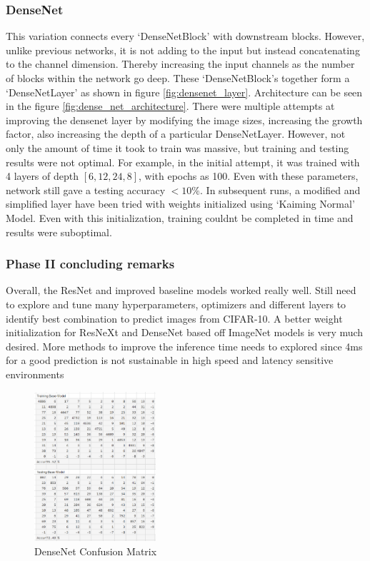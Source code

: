 \documentclass[conference]{IEEEtran}
\begin{document}
	
		\subsubsection{DenseNet}
		This variation connects every `DenseNetBlock' with downstream blocks. However, unlike previous networks, it is not adding to the input but instead concatenating to the channel dimension. Thereby increasing the input channels as the number of blocks within the network go deep. These `DenseNetBlock's together form a `DenseNetLayer' as shown in figure \ref{fig:densenet_layer}. Architecture can be seen in the figure \ref{fig:dense_net_architecture}. There were multiple attempts at improving the densenet layer by modifying the image sizes, increasing the growth factor, also increasing the depth of a particular DenseNetLayer. However, not only the amount of time it took to train was massive, but training and testing results were not optimal. For example, in the initial attempt, it was trained with 4 layers of depth $[6,12,24,8]$, with epochs as 100. Even with these parameters, network still gave a testing accuracy $<10\%$. In subsequent runs, a modified and simplified layer have been tried with weights initialized using `Kaiming Normal' Model. Even with this initialization, training couldnt be completed in time and results were suboptimal. 
		
		\subsubsection{Phase II concluding remarks}
		Overall, the ResNet and improved baseline models worked really well. Still need to explore and tune many hyperparameters, optimizers and different layers to identify best combination to predict images from CIFAR-10. A better weight initialization for ResNeXt and DenseNet based off ImageNet models is very much desired. More methods to improve the inference time needs to explored since 4ms for a good prediction is not sustainable in high speed and latency sensitive environments
		
		\begin{figure}
			\centering
			\includegraphics[width=0.4\textwidth]{CM/densenet.png}
			\caption{DenseNet Confusion Matrix}
			\label{fig:densenet_cm}
		\end{figure}
	
\end{document}
